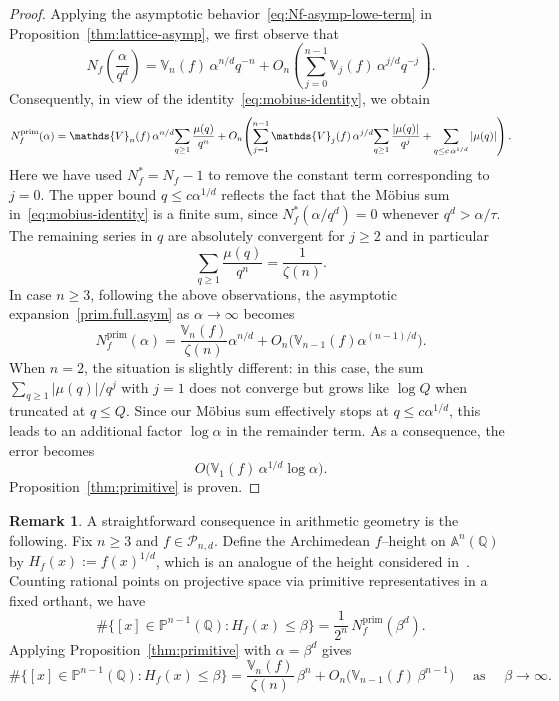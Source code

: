 \documentclass[11pt]{article}
\theoremstyle{definition}
\numberwithin{equation}{section}
\newtheorem{remark}[theorem]{Remark}
\newcommand{\cP}{\mathcal{P}}        %
\newcommand{\opV}{\mathds{V}}       %
\begin{document}
\begin{proof}
Applying the asymptotic behavior~\eqref{eq:Nf-asymp-lowe-term} in Proposition~\ref{thm:lattice-asymp}, we first observe that
\[
  N_f\!\left(\frac{\alpha}{q^d}\right)
  = 
  \opV_n(f)\,\alpha^{n/d} q^{-n}
  +
  O_n \left(
  \sum_{j=0}^{n-1}\opV_j(f)\,\alpha^{j/d} q^{-j}
  \right).
\]
Consequently, in view of the identity~\eqref{eq:mobius-identity}, we obtain
\begin{equation}\label{prim.full.asym}
  N^{\rm prim}_f(\alpha)
  = 
  \opV_n(f)\,\alpha^{n/d}\!\sum_{q\ge1}\frac{\mu(q)}{q^{n}}
  + O_n\!
  \left(\sum_{j=1}^{n-1}\opV_j(f)\,\alpha^{j/d}\!\sum_{q\ge1}\frac{|\mu(q)|}{q^{j}}
    + \sum_{q\le c\,\alpha^{1/d}}|\mu(q)|
    \right).
\end{equation}
Here we have used $N_f^{\ast} = N_f - 1$ to remove the constant term corresponding to $j = 0$. 
The upper bound $q \le c \textstyle\alpha^{1/d}$ reflects the fact that the M\"obius sum in~\eqref{eq:mobius-identity} is a finite sum, since 
$N_f^{\ast}(\alpha/q^d) = 0$ whenever $q^d > \alpha / \tau$. 
The remaining series in $q$ are absolutely convergent for $j \ge 2$ and in particular
\[
\sum_{q \ge 1} \frac{\mu(q)}{q^n} = \frac{1}{\zeta(n)}.
\]
In case $n \geq 3$,  following the above observations, the asymptotic expansion~\eqref{prim.full.asym} as $\alpha \to \infty$ becomes
\[
  N_f^{\mathrm{prim}}(\alpha)
  = \frac{\opV_n(f)}{\zeta(n)} \alpha^{n/d}
  + O_n 
  \big(\opV_{n-1}(f) \alpha^{(n-1)/d} \big).
\]
When $n=2$, the situation is slightly different: 
in this case, the sum $\textstyle\sum_{q\ge1}|\mu(q)|/q^j$ with $j=1$ does not converge but grows like $\log Q$ when truncated at $q\le Q$. 
Since our M\"obius sum effectively stops at $q \le c \textstyle\alpha^{1/d}$, 
this leads to an additional factor $\log \alpha$ in the remainder term. 
As a consequence, the error becomes
\[
O\!\big(\opV_1(f)\,\alpha^{1/d}\log\alpha\big).
\]
Proposition~\ref{thm:primitive} is proven.
\end{proof}

\begin{remark}
A straightforward consequence in arithmetic geometry is the following.  
Fix $n \ge 3$ and $f \in \cP_{n,d}$.
Define the Archimedean $f$–height on $\mathbb{A}^n(\mathbb{Q})$ by 
$H_f(x) := f(x)^{1/d}$, which is an analogue of the height considered in~\cite{ChambertLoirTschinkel2010}.  
Counting rational points on projective space via primitive representatives in a fixed orthant, we have
\[
  \# \big\{[x]  \in \mathbb{P}^{n-1}(\mathbb{Q}) : H_f(x) \le \beta \big\}
  = \frac{1}{2^n}\, N^{\mathrm{prim}}_f(\beta^d).
\]
Applying Proposition~\ref{thm:primitive} with $\alpha = \beta^d$ gives
\[
  \# \big\{ 
  [x] \in \mathbb{P}^{n-1}(\mathbb{Q}) : H_f(x) \le \beta
  \big\}
  = \frac{\opV_n(f)}{\zeta(n)}\, \beta^{n}
  + O_n\!\big(\opV_{n-1}(f)\, \beta^{n-1}\big)
  \quad \text{ as } \quad \beta \to \infty.
\]
\end{remark}
\end{document}
